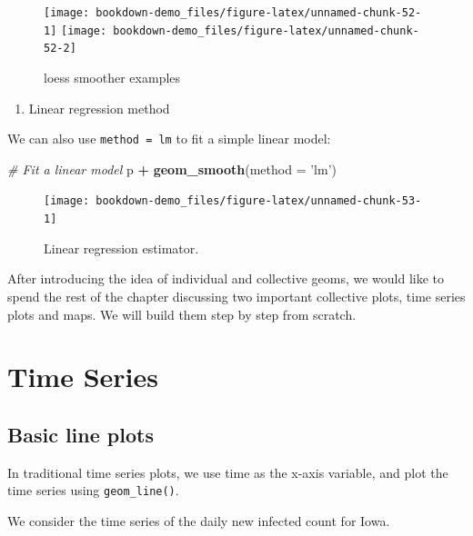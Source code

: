 \documentclass[]{book}
\newenvironment{Shaded}{\begin{snugshade}}{\end{snugshade}}
\newcommand{\KeywordTok}[1]{\textcolor[rgb]{0.13,0.29,0.53}{\textbf{#1}}}
\newcommand{\DataTypeTok}[1]{\textcolor[rgb]{0.13,0.29,0.53}{#1}}
\newcommand{\StringTok}[1]{\textcolor[rgb]{0.31,0.60,0.02}{#1}}
\newcommand{\CommentTok}[1]{\textcolor[rgb]{0.56,0.35,0.01}{\textit{#1}}}
\newcommand{\OperatorTok}[1]{\textcolor[rgb]{0.81,0.36,0.00}{\textbf{#1}}}
\newcommand{\NormalTok}[1]{#1}
\providecommand{\tightlist}{%
  \setlength{\itemsep}{0pt}\setlength{\parskip}{0pt}}
\begin{document}
\begin{figure}
\texttt{[image: bookdown-demo\_files/figure-latex/unnamed-chunk-52-1]} \texttt{[image: bookdown-demo\_files/figure-latex/unnamed-chunk-52-2]} \caption{loess smoother examples}\label{fig:unnamed-chunk-52}
\end{figure}

\begin{enumerate}
\def\labelenumi{\arabic{enumi}.}
\setcounter{enumi}{1}
\tightlist
\item
  Linear regression method
\end{enumerate}

We can also use
\texttt{method\ =\ \textquotesingle{}lm\textquotesingle{}} to fit a
simple linear model:

\begin{Shaded}
\begin{Highlighting}[]
\CommentTok{# Fit a linear model}
\NormalTok{p }\OperatorTok{+}\StringTok{ }\KeywordTok{geom_smooth}\NormalTok{(}\DataTypeTok{method =} \StringTok{'lm'}\NormalTok{)  }
\end{Highlighting}
\end{Shaded}

\begin{figure}
\texttt{[image: bookdown-demo\_files/figure-latex/unnamed-chunk-53-1]} \caption{Linear regression estimator.}\label{fig:unnamed-chunk-53}
\end{figure}

After introducing the idea of individual and collective geoms, we would
like to spend the rest of the chapter discussing two important
collective plots, time series plots and maps. We will build them step by
step from scratch.

\section{Time Series}\label{time-series}

\subsection{Basic line plots}\label{basic-line-plots}

In traditional time series plots, we use time as the x-axis variable,
and plot the time series using \texttt{geom\_line()}.

We consider the time series of the daily new infected count for Iowa.
\end{document}
